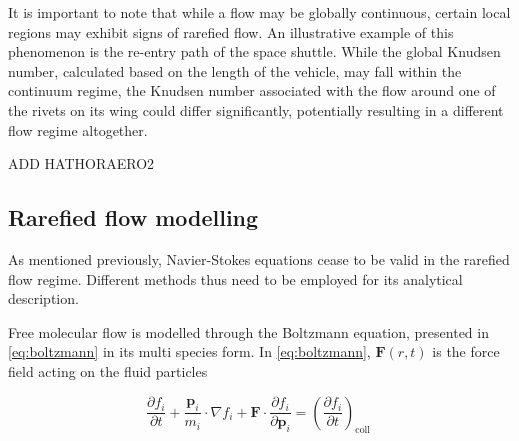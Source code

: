 It is important to note that while a flow may be globally continuous, certain local regions may exhibit signs of rarefied flow. An illustrative example of this phenomenon is the re-entry path of the space shuttle. While the global Knudsen number, calculated based on the length of the vehicle, may fall within the continuum regime, the Knudsen number associated with the flow around one of the rivets on its wing could differ significantly, potentially resulting in a different flow regime altogether.

ADD HATHORAERO2

\subsection{Rarefied flow modelling}
As mentioned previously, Navier-Stokes equations cease to be valid in the rarefied flow regime. Different methods thus need to be employed for its analytical description.

Free molecular flow is modelled through the Boltzmann equation, presented in \autoref{eq:boltzmann} in its multi species form. In \autoref{eq:boltzmann}, $\mathbf{F}(r, t)$ is the force field acting on the fluid particles

\begin{equation}
    \frac{\partial f_i}{\partial t}+\frac{\mathbf{p}_i}{m_i} \cdot \nabla f_i+\mathbf{F} \cdot \frac{\partial f_i}{\partial \mathbf{p}_i}=\left(\frac{\partial f_i}{\partial t}\right)_{\text {coll }}
    \label{eq:boltzmann}
\end{equation}

